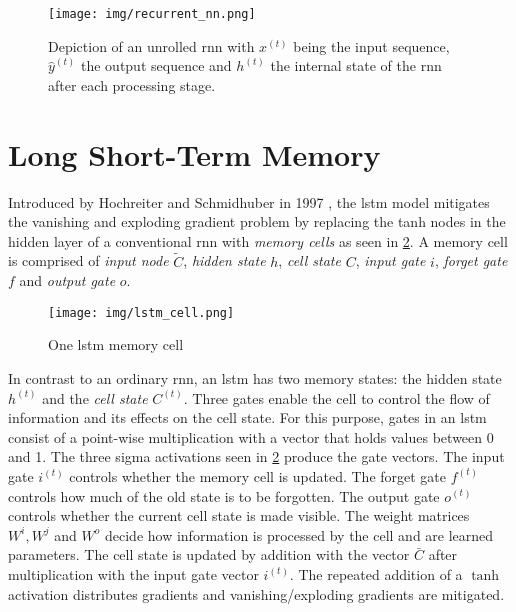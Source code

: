 \begin{figure}[h]
	\centering
	\texttt{[image: img/recurrent\_nn.png]}
	\caption{Depiction of an unrolled \gls{rnn} with $x^{(t)}$ being the input sequence, $\hat{y}^{(t)}$ the output sequence and $h^{(t)}$ the internal state of the \gls{rnn} after each processing stage.}
	\label{fig:background:rnn}
\end{figure}

\section{Long Short-Term Memory}

Introduced by Hochreiter and Schmidhuber in 1997 \cite{lstm_origin}, the \gls{lstm} model mitigates the vanishing and exploding gradient problem by replacing the tanh nodes in the hidden layer of a conventional \gls{rnn} with \textit{memory cells} as seen in \ref{fig:background:lstm}. 
A memory cell is comprised of \textit{input node} $\tilde{C}$, \textit{hidden state} $h$, \textit{cell state} $C$, \textit{input gate} $i$, \textit{forget gate} $f$ and \textit{output gate} $o$. 

\begin{figure}[h]
	\centering
	\texttt{[image: img/lstm\_cell.png]}
	\caption{One \gls{lstm} memory cell \cite{rnn_zachary}}
	\label{fig:background:lstm}
\end{figure}

In contrast to an ordinary \gls{rnn}, an \gls{lstm} has two memory states: the hidden state $h^{(t)}$ and the \textit{cell state} $C^{(t)}$. Three gates enable the cell to control the flow of information and its effects on the cell state. For this purpose, gates in an \gls{lstm} consist of a point-wise multiplication with a vector that holds values between 0 and 1. The three sigma activations seen in \ref{fig:background:lstm} produce the gate vectors. The input gate $i^{(t)}$ controls whether the memory cell is updated. The forget gate $f^{(t)}$ controls how much of the old state is to be forgotten. The output gate $o^{(t)}$ controls whether the current cell state is made visible. The weight matrices $W^i, W^j$ and $W^o$ decide how information is processed by the cell and are learned parameters. The cell state is updated by addition with the vector $\bar{C}$ after multiplication with the input gate vector $i^{(t)}$. The repeated addition of a $\tanh$ activation distributes gradients and vanishing/exploding gradients are mitigated.

